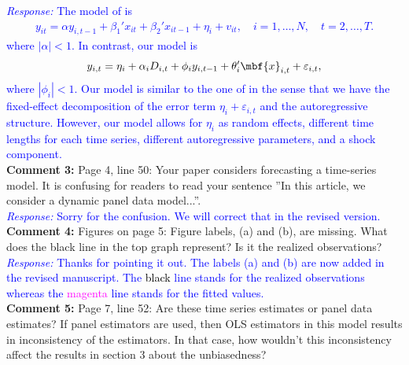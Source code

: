 \documentclass[12pt]{article}
\newcommand{\response}[1]{\noindent \textcolor{blue}{\emph{Response:} #1}}
\begin{document}
\response{The model of \citet{blundell1998initial} is
\begin{align*}
  y_{it} = \alpha y_{i, t-1} + \beta_1'x_{it} + \beta_2'x_{it-1} + \eta_i + v_{it}, \quad i = 1, \ldots, N, \quad t = 2, \ldots, T.
\end{align*}
where $|\alpha|<1$. In contrast, our model is
\begin{align*}
 y_{i,t} =\eta_i +\alpha_i D_{i,t} + \phi_i y_{i, t-1} + \theta_i'\mbf{x}_{i,t} + \varepsilon_{i,t},
\end{align*}
where $|\phi_i| < 1$. Our model is similar to the one of \citet{blundell1998initial}  in the sense that we have the fixed-effect decomposition of the error term $\eta_i +\varepsilon_{i,t}$ and the autoregressive structure. However, our model allows for $\eta_i$ as random effects, different time lengths for each time series, different autoregressive parameters, and a shock component.}\\

{\bf Comment 3:} Page 4, line 50: Your paper considers forecasting a time-series model. It is confusing for readers to read your sentence ”In this article, we consider a dynamic panel data model...''.\\

\response{Sorry for the confusion. We will correct that in the revised version.}\\

{\bf  Comment 4:} Figures on page 5: Figure labels, (a) and (b), are missing. What does the black line in the top graph represent? Is it the realized observations?\\

\response{Thanks for pointing it out. The labels (a) and (b) are now added in the revised manuscript.   The \textcolor{black}{black} line stands for the realized observations whereas the \textcolor{magenta}{magenta} line stands for the fitted values.} \\

{\bf Comment 5:} Page 7, line 52: Are these time series estimates or panel data estimates? If panel estimators are used, then OLS estimators in this model results in inconsistency of the estimators. In that case, how wouldn't this inconsistency affect the results in section 3 about the unbiasedness? \\
\end{document}
